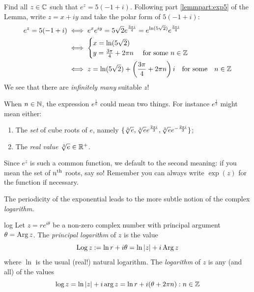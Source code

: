 \begin{example}{}{}
	Find all $z\in\mathbb{C}$ such that $e^z=5(-1+i)$.\smallbreak
	Following part \ref*{lemmpart:exp5} of the Lemma, write $z=x+iy$ and take the polar form of $5(-1+i)$:
	\begin{align*}
		e^z=5(-1+i)&\iff e^xe^{iy}=5\sqrt 2e^{\frac{3\pi i}{4}} =e^{\ln(5\sqrt 2)}e^{\frac{3\pi i}{4}}\\
		&\iff
		\begin{cases}
			x=\ln(5\sqrt 2)\\
			y=\frac{3\pi}4+2\pi n\quad\text{ for some }n\in\mathbb{Z}
		\end{cases}\\
		&\iff z=\ln(5\sqrt 2)+\left(\frac{3\pi}4+2\pi n\right)i\quad\text{for some}\quad n\in\mathbb{Z}
	\end{align*}
	We see that there are \emph{infinitely many} suitable $z$!
\end{example}
\goodbreak


\begin{aside}
	
	When $n\in\mathbb{N}$, the expression $e^{\frac 1n}$ could mean two things. For instance $e^{\frac 13}$ might mean either:\smallskip
  \begin{enumerate}\itemsep0pt
    \item The \emph{set} of cube roots of $e$, namely $\{\sqrt[3]{e},\sqrt[3]{e}e^{\frac{2\pi i}{3}},\sqrt[3]{e}e^{-\frac{2\pi i}{3}}\}$;
    \item The \emph{real value} $\sqrt[3]{e}\in\mathbb{R}^+$.
  \end{enumerate}
  Since $e^z$ is such a common function, we default to the second meaning: if you mean the set of $n\textsuperscript{th}$ roots, say so! Remember you can always write $\exp(z)$ for the function if necessary.
\end{aside}


The periodicity of the exponential leads to the more subtle notion of the complex \emph{logarithm.}

\begin{defn}{}{log}
	Let $z=re^{i\theta}$ be a non-zero complex number with principal argument $\theta=\operatorname{Arg} z$. The \emph{principal logarithm} of $z$ is the value
	\[
		\operatorname{Log} z:=\ln r+i\theta =\ln\left| z\right|+i\operatorname{Arg} z
	\]
	where $\ln$ is the usual (real!) natural logarithm. The \emph{logarithm} of $z$ is any (and all) of the values\footnotemark
	\[
		\log z=\ln\left| z\right|+i\arg z=\ln r+i(\theta+2\pi n):n\in\mathbb{Z}
	\]
\end{defn}

